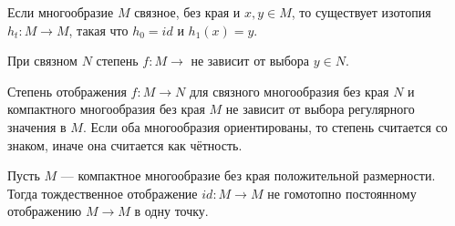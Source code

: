 \begin{to_lem}
	Если многообразие $M$ связное, без края и $x,y \in M$, то существует изотопия $h_t \colon M \rightarrow M $, такая что $h_0 = id$ и $h_1(x)  = y$.
\end{to_lem}

\begin{to_con}
	При связном $N$ степень $f \colon M \rightarrow$ не зависит от выбора $y \in N$.
\end{to_con}

\begin{to_thr}
	Степень отображения $f \colon M \rightarrow N$ для связного многообразия без края $N$ и компактного многообразия без края $M$ не зависит от выбора регулярного значения в $M$. Если оба многообразия ориентированы, то степень считается со знаком, иначе она считается как чётность.
\end{to_thr}

\begin{to_con}
	Пусть $M$ --- компактное многообразие без края положительной размерности. Тогда тождественное отображение $id\colon M \rightarrow M$ не гомотопно постоянному отображению $M \rightarrow M$ в одну точку.
\end{to_con}